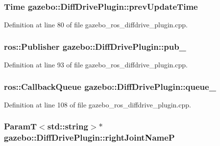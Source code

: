 \subsubsection[{prevUpdateTime}]{\setlength{\rightskip}{0pt plus 5cm}Time {\bf gazebo::DiffDrivePlugin::prevUpdateTime}\hspace{0.3cm}{\ttfamily  [private]}}\label{classgazebo_1_1DiffDrivePlugin_a384e2c43a7e1d7494741cfa2477f99ca}


Definition at line 80 of file gazebo\_\-ros\_\-diffdrive\_\-plugin.cpp.

\subsubsection[{pub\_\-}]{\setlength{\rightskip}{0pt plus 5cm}ros::Publisher {\bf gazebo::DiffDrivePlugin::pub\_\-}\hspace{0.3cm}{\ttfamily  [private]}}\label{classgazebo_1_1DiffDrivePlugin_a92718144bfdc2527f6e971590f2761ed}


Definition at line 93 of file gazebo\_\-ros\_\-diffdrive\_\-plugin.cpp.

\subsubsection[{queue\_\-}]{\setlength{\rightskip}{0pt plus 5cm}ros::CallbackQueue {\bf gazebo::DiffDrivePlugin::queue\_\-}\hspace{0.3cm}{\ttfamily  [private]}}\label{classgazebo_1_1DiffDrivePlugin_a9401ec20a04a3cd0a5a4a7079a8e00fb}


Definition at line 108 of file gazebo\_\-ros\_\-diffdrive\_\-plugin.cpp.

\subsubsection[{rightJointNameP}]{\setlength{\rightskip}{0pt plus 5cm}ParamT$<$std::string$>$$\ast$ {\bf gazebo::DiffDrivePlugin::rightJointNameP}\hspace{0.3cm}{\ttfamily  [private]}}\label{classgazebo_1_1DiffDrivePlugin_a81c1de952961f6942982fe0e0b385a6b}


